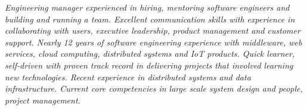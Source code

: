 {\selectfont
\textit{Engineering manager experienced in hiring, mentoring software engineers and building and running a team. Excellent communication skills with experience in collaborating with users, executive leadership, product management and customer support. Nearly 12 years of software engineering experience with middleware, web services, cloud computing, distributed systems and IoT products. Quick learner, self-driven with proven track record in delivering projects that involved learning new technologies. Recent experience in distributed systems and data infrastructure. Current core competencies in large scale system design and people, project management.}
}